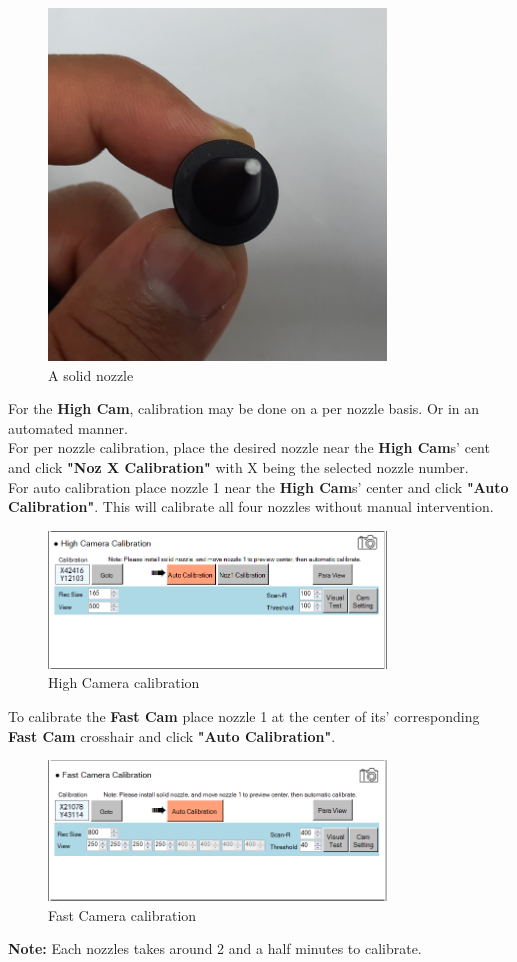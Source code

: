 \documentclass[a4paper,10pt]{report}
\begin{document}
 \begin{figure}[!htb]
 \centering
 \includegraphics[width=0.8\textwidth]{scrot39.png}
 \caption{A solid nozzle}
\end{figure}
\newpage
For the \textbf{High Cam}, calibration may be done on a per nozzle basis. Or in an automated manner.\\
For per nozzle calibration, place the desired nozzle near the \textbf{High Cam}s' cent and click \textbf{"Noz X Calibration"} with X being the selected nozzle number.\\
For auto calibration place nozzle 1 near the \textbf{High Cam}s' center and click \textbf{"Auto Calibration"}. This will calibrate all four nozzles without manual intervention.\\

\begin{figure}[!htb]
 \centering
 \includegraphics[width=0.8\textwidth]{scrot38.png}
 \caption{High Camera calibration}
\end{figure}
To calibrate the \textbf{Fast Cam} place nozzle 1 at the center of its' corresponding \textbf{Fast Cam} crosshair and click \textbf{"Auto Calibration"}.\\

 \begin{figure}[!htb]
 \centering
 \includegraphics[width=0.8\textwidth]{scrot40.png}
 \caption{Fast Camera calibration}
\end{figure}
\textbf{Note: } Each nozzles takes around 2 and a half minutes to calibrate.
\end{document}
